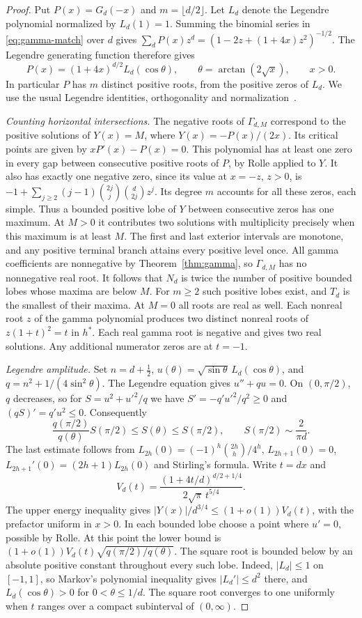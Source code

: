 \begin{proof}
Put $P(x)=G_d(-x)$ and $m=\lfloor d/2\rfloor$.
Let $L_d$ denote the Legendre polynomial normalized by $L_d(1)=1$.
Summing the binomial series in \eqref{eq:gamma-match} over $d$ gives
$\sum_d P(x)z^d=(1-2z+(1+4x)z^2)^{-1/2}$.
The Legendre generating function therefore gives
\[
 P(x)=(1+4x)^{d/2} L_d(\cos\theta),\qquad
 \theta=\arctan(2\sqrt{x}),\qquad x>0 .
\]
In particular $P$ has $m$ distinct positive roots, from the positive
zeros of $L_d$. We use the usual Legendre identities, orthogonality and
normalization~\cite[Ch.~18]{dlmf}.

\emph{Counting horizontal intersections.}
The negative roots of $\Gamma_{d,M}$ correspond to the positive
solutions of $Y(x)=M$, where $Y(x)=-P(x)/(2x)$. Its critical points
are given by $xP'(x)-P(x)=0$. This polynomial has at least one
zero in every gap between consecutive positive roots of $P$, by Rolle
applied to $Y$. It also has exactly one negative zero, since its value
at $x=-z$, $z>0$, is $-1+\sum_{j\ge2}(j-1)
\binom{2j}{j}\binom d{2j}z^j$. Its degree $m$ accounts for all
these zeros, each simple. Thus a bounded positive lobe of $Y$ between
consecutive zeros has one maximum. At $M>0$ it contributes two
solutions with multiplicity precisely when this maximum is at least $M$.
The first and last exterior intervals are monotone, and any positive
terminal branch attains every positive level once.
All gamma coefficients are nonnegative by Theorem~\ref{thm:gamma}, so
$\Gamma_{d,M}$ has no nonnegative real root. It follows that $N_d$ is
twice the number of positive bounded lobes whose maxima are below $M$.
For $m\ge2$ such positive lobes exist, and $T_d$ is the smallest of
their maxima. At $M=0$ all roots are real as well. Each nonreal root
$z$ of the gamma polynomial produces two distinct nonreal roots of
$z(1+t)^2=t$ in $h^*$. Each real gamma root is negative and gives
two real solutions. Any additional numerator zeros are at $t=-1$.

\emph{Legendre amplitude.}
Set $n=d+\tfrac12$, $u(\theta)=\sqrt{\sin\theta}\,L_d(\cos\theta)$,
and $q=n^2+1/(4\sin^2\theta)$. The Legendre equation gives
$u''+q u=0$. On $(0,\pi/2)$, $q$ decreases, so for
$S=u^2+u'^2/q$ we have $S'=-q'u'^2/q^2\ge0$ and $(qS)'=q'u^2\le0$.
Consequently
\[
 \frac{q(\pi/2)}{q(\theta)}S(\pi/2)\le S(\theta)\le S(\pi/2),
 \qquad S(\pi/2)\sim\frac{2}{\pi d}.
\]
The last estimate follows from
$L_{2h}(0)=(-1)^h\binom{2h}{h}/4^h$, $L_{2h+1}(0)=0$,
$L_{2h+1}'(0)=(2h+1)L_{2h}(0)$ and Stirling's formula.
Write $t=dx$ and
\[
 V_d(t)=\frac{(1+4t/d)^{d/2+1/4}}{2\sqrt\pi\,t^{5/4}} .
\]
The upper energy inequality gives
$|Y(x)|/d^{3/4}\le (1+o(1))V_d(t)$, with the prefactor uniform
in $x>0$. In each bounded lobe choose a point where $u'=0$, possible
by Rolle. At this point the lower bound is
$(1+o(1))V_d(t)\sqrt{q(\pi/2)/q(\theta)}$.
The square root is bounded below by an absolute positive constant
throughout every such lobe. Indeed, $|L_d|\le1$ on $[-1,1]$, so
Markov's polynomial inequality gives $|L_d'|\le d^2$ there, and
$L_d(\cos\theta)>0$ for $0<\theta\le1/d$. The square root converges to
one uniformly when $t$ ranges over a compact subinterval of $(0,\infty)$.


\end{proof}

